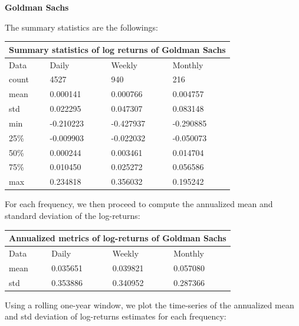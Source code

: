 \documentclass[10pt]{article}
\newenvironment{exercise}[2][Exercise]{\begin{trivlist}
  \item[\hskip \labelsep {\bfseries #1}\hskip \labelsep {\bfseries #2.}]}{\end{trivlist}}
\begin{document}
\begin{exercise}{4}
	\bigbreak	
		
	\textbf{Goldman Sachs}
	
	\smallbreak
	
	The summary statistics are the followings:
	
	\bigbreak	
	
	\begin{tabular}{ |p{3cm}||p{3cm}|p{3cm}|p{3cm}|  }
 		\hline
		\multicolumn{4}{|c|}{Summary statistics of log returns of Goldman Sachs} \\
		\hline
		Data & Daily & Weekly & Monthly\\
 		\hline
 		count   &  4527 & 940 & 216\\
 		mean & 0.000141 & 0.000766 & 0.004757\\
 		std & 0.022295 & 0.047307 & 0.083148\\
 		min & -0.210223 & -0.427937 & -0.290885\\
 		25\% & -0.009903 & -0.022032 & -0.050073\\
 		50\% & 0.000244 & 0.003461 & 0.014704\\
 		75\% & 0.010450 & 0.025272 & 0.056586\\
 		max & 0.234818 & 0.356032 & 0.195242\\
 		\hline
	\end{tabular}
	
	\bigbreak	
	
	For each frequency, we then proceed to compute the annualized mean and standard deviation of the log-returns:
	
	\bigbreak
	
	\begin{tabular}{ |p{3cm}||p{3cm}|p{3cm}|p{3cm}|  }
		\hline
	 	\multicolumn{4}{|c|}{Annualized metrics of log-returns of Goldman Sachs} \\
	 	\hline
	 	Data & Daily & Weekly & Monthly\\
 		\hline
 		mean  &  0.035651 & 0.039821 & 0.057080\\
 		std & 0.353886 & 0.340952 & 0.287366\\
 		\hline
	\end{tabular}
	
	\bigbreak	
	
	Using a rolling one-year window, we plot the time-series of the annualized mean and std deviation of log-returns estimates for each frequency:
	
	\begin{figure}[H]
	

\end{figure}
\end{exercise}
\end{document}
